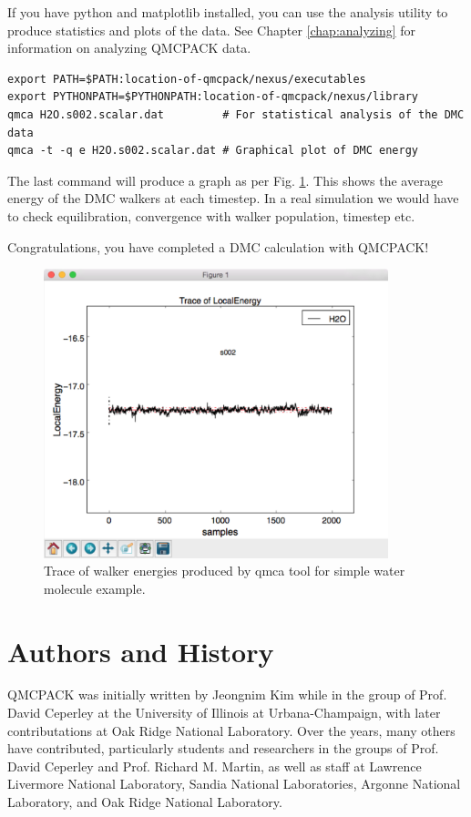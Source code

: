 If you have python and matplotlib installed, you can use the
 analysis utility to produce statistics and plots of the
data. See Chapter \ref{chap:analyzing} for information on analyzing
QMCPACK data.
\begin{verbatim}
export PATH=$PATH:location-of-qmcpack/nexus/executables 
export PYTHONPATH=$PYTHONPATH:location-of-qmcpack/nexus/library
qmca H2O.s002.scalar.dat         # For statistical analysis of the DMC data
qmca -t -q e H2O.s002.scalar.dat # Graphical plot of DMC energy
\end{verbatim}

The last command will produce a graph as per
Fig. \ref{fig:quick_qmca_dmc_trace}. This shows the average energy of
the DMC walkers at each timestep. In a real simulation we would have
to check equilibration, convergence with walker population, timestep etc.

Congratulations, you have completed a DMC calculation with QMCPACK!

\begin{figure}
  \centering
  \includegraphics[width=10cm]{./figures/quick_qmca_dmc_trace.png}
  \caption{Trace of walker energies produced by qmca tool for simple
    water molecule example.}
  \label{fig:quick_qmca_dmc_trace}
\end{figure}

\section{Authors and History}
\label{sec:history}
QMCPACK was initially written by Jeongnim Kim while in the group of
Prof. David Ceperley at the University of Illinois at
Urbana-Champaign, with later contributations at Oak Ridge National Laboratory. Over the years, many others have contributed, particularly
students and researchers in the groups of Prof. David Ceperley
and Prof. Richard M. Martin, as well as staff at Lawrence Livermore
National Laboratory, Sandia National Laboratories, Argonne National
Laboratory, and Oak Ridge National Laboratory.


